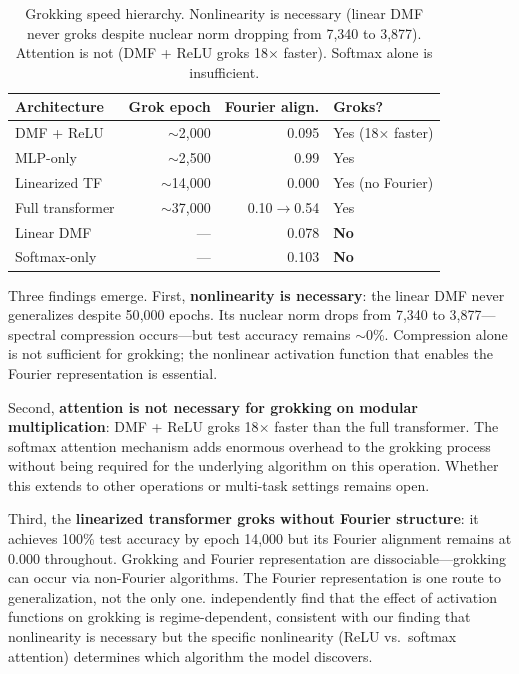 \begin{table}[t]
\centering
\small
\begin{tabular}{lrrl}
\toprule
Architecture & Grok epoch & Fourier align. & Groks? \\
\midrule
DMF + ReLU     & $\sim$2{,}000   & 0.095 & Yes (18$\times$ faster) \\
MLP-only       & $\sim$2{,}500   & 0.99  & Yes \\
Linearized TF  & $\sim$14{,}000  & 0.000 & Yes (no Fourier) \\
Full transformer & $\sim$37{,}000 & 0.10$\to$0.54 & Yes \\
Linear DMF     & ---          & 0.078 & \textbf{No} \\
Softmax-only   & ---          & 0.103 & \textbf{No} \\
\bottomrule
\end{tabular}
\caption{Grokking speed hierarchy. Nonlinearity is necessary (linear DMF never
groks despite nuclear norm dropping from 7{,}340 to 3{,}877). Attention is not
(DMF + ReLU groks 18$\times$ faster). Softmax alone is insufficient.}
\label{tab:grokking_speed}
\end{table}

Three findings emerge. First, \textbf{nonlinearity is necessary}: the linear
DMF never generalizes despite 50{,}000 epochs. Its nuclear norm drops from
7{,}340 to 3{,}877---spectral compression occurs---but test accuracy remains
$\sim$0\%. Compression alone is not sufficient for grokking; the nonlinear
activation function that enables the Fourier representation is essential.

Second, \textbf{attention is not necessary for grokking on modular
multiplication}: DMF + ReLU groks 18$\times$ faster than the full
transformer. The softmax attention mechanism adds enormous overhead to the
grokking process without being required for the underlying algorithm on this
operation. Whether this extends to other operations or multi-task settings
remains open.

Third, the \textbf{linearized transformer groks without Fourier structure}:
it achieves 100\% test accuracy by epoch 14{,}000 but its Fourier alignment
remains at 0.000 throughout. Grokking and Fourier representation are
dissociable---grokking can occur via non-Fourier algorithms. The Fourier
representation is one route to generalization, not the only one.
\citet{manir2026systematic} independently find that the effect of activation
functions on grokking is regime-dependent, consistent with our finding that
nonlinearity is necessary but the specific nonlinearity (ReLU vs.\ softmax
attention) determines which algorithm the model discovers.

